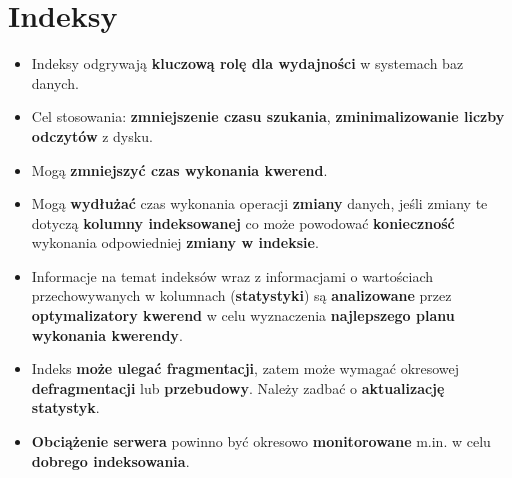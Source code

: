 \documentclass[a4paper]{article}
\begin{document}
\section{Indeksy}
\begin{itemize}
    \item Indeksy odgrywają \textbf{kluczową rolę dla wydajności} w systemach baz danych.
    \item Cel stosowania: \textbf{zmniejszenie czasu szukania}, \textbf{zminimalizowanie liczby odczytów} z dysku.
    \item Mogą \textbf{zmniejszyć czas wykonania kwerend}. \item Mogą \textbf{wydłużać} czas wykonania operacji \textbf{zmiany} danych, jeśli zmiany te dotyczą \textbf{kolumny indeksowanej} co może powodować \textbf{konieczność} wykonania odpowiedniej \textbf{zmiany w indeksie}.
    \item Informacje na temat indeksów wraz z informacjami o wartościach przechowywanych w kolumnach (\textbf{statystyki}) są \textbf{analizowane} przez \textbf{optymalizatory kwerend} w celu wyznaczenia \textbf{najlepszego planu wykonania kwerendy}.
     \item Indeks \textbf{może ulegać fragmentacji}, zatem może wymagać okresowej \textbf{defragmentacji} lub \textbf{przebudowy}. Należy zadbać o \textbf{aktualizację statystyk}.
     \item \textbf{Obciążenie serwera} powinno być okresowo \textbf{monitorowane} m.in. w celu \textbf{dobrego indeksowania}.
\end{itemize}
\end{document}
